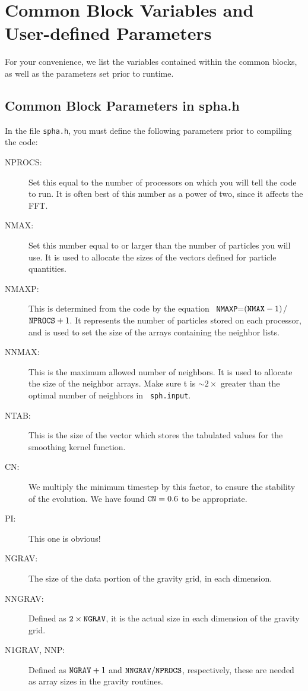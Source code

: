 \newpage
\section{Common Block Variables and User-defined Parameters}
\label{par}

For your convenience, we list the variables contained within the
common blocks, as well as the parameters set prior to runtime.

\subsection{Common Block Parameters in spha.h}
In the file {\tt spha.h}, you must define the following parameters
prior to compiling the code:
\begin{description}
\item[NPROCS:] Set this equal to the number of processors on which you will
tell the code to run.  It is often best of this number as a power of
two, since it affects the FFT.
\item[NMAX:] Set this number equal to or larger than the number of
particles you will use.  It is used to allocate the sizes of the
vectors defined for particle quantities.
\item[NMAXP:]This is determined from the code by the equation {\tt
NMAXP}=$({\tt NMAX}-1)$/${\tt NPROCS}+1$.  It represents the number of
particles stored on each processor, and is used to set the size of the
arrays containing the neighbor lists.
\item[NNMAX:]This is the maximum allowed number of neighbors.  It is
used to allocate the size of the neighbor arrays.  Make sure t is
$\sim 2\times$ greater than the optimal number of neighbors in {\tt
sph.input}.
\item[NTAB:] This is the size of the vector which stores the tabulated
values for the smoothing kernel function. 
\item[CN:] We multiply the minimum timestep by this factor, to ensure
the stability of the evolution.  We have found ${\tt CN}=0.6$ to be
appropriate.  
\item[PI:] This one is obvious!
\item[NGRAV:] The size of the data portion of the gravity grid, in
each dimension.
\item[NNGRAV:] Defined as $2\times{\tt NGRAV}$, it is the actual size
in each dimension of the gravity grid.
\item[N1GRAV, NNP:] Defined as ${\tt NGRAV}+1$ and ${\tt NNGRAV}/{\tt
NPROCS}$, respectively, these are needed as array sizes in the gravity
routines.  
\end{description}

